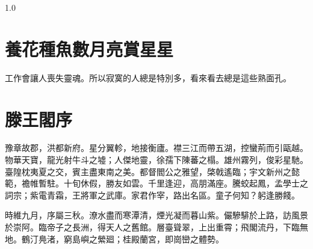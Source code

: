 \documentclass[12pt,a4paper,oneside]{report}
\begin{document}
\clearpage
\begin{spacing}{1.0}
    
    \setlength{\parskip}{0pt}
    \setlength{\itemsep}{0pt}

    \setlength{\cftbeforechapskip}{0pt}
    \setlength{\cftbeforesecskip}{0pt}
    \setlength{\cftbeforetabskip}{0pt}
    \setlength{\cftbeforefigskip}{0pt}

    \makeatletter
    \def\addvspace#1{}
    \makeatother

    \tableofcontents

    \clearpage
    
    \listoftables

    \clearpage
    
    \listoffigures

\end{spacing}
\clearpage

\setlength{\parskip}{12pt}
\setlength{\itemsep}{12pt}

\NTOUMainMatter



\chapter{養花種魚數月亮賞星星}

工作會讓人喪失靈魂。所以寂寞的人總是特別多，看來看去總是這些熟面孔。
\chapter{滕王閣序}

 
豫章故郡，洪都新府。星分翼軫，地接衡廬。襟三江而帶五湖，控蠻荊而引甌越。物華天寶，龍光射牛斗之墟；人傑地靈，徐孺下陳蕃之榻。雄州霧列，俊彩星馳。臺隍枕夷夏之交，賓主盡東南之美。都督閻公之雅望，棨戟遙臨；宇文新州之懿範，襜帷暫駐。十旬休假，勝友如雲。千里逢迎，高朋滿座。騰蛟起鳳，孟學士之詞宗；紫電青霜，王將軍之武庫。家君作宰，路出名區。童子何知？躬逢勝餞。

時維九月，序屬三秋。潦水盡而寒潭清，煙光凝而暮山紫。儼驂騑於上路，訪風景於崇阿。臨帝子之長洲，得天人之舊館。層臺聳翠，上出重霄；飛閣流丹，下臨無地。鶴汀鳧渚，窮島嶼之縈廻；桂殿蘭宮，即崗巒之體勢。
\end{document}
